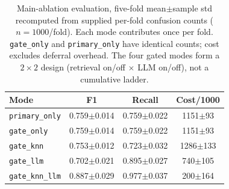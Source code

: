 \begin{table}[!t]
\centering
\caption{Main-ablation evaluation, five-fold mean$\pm$sample std recomputed from supplied per-fold confusion counts ($n{=}1000$/fold). Each mode contributes once per fold. \texttt{gate\_only} and \texttt{primary\_only} have identical counts; cost excludes deferral overhead. The four gated modes form a $2{\times}2$ design (retrieval on/off $\times$ LLM on/off), not a cumulative ladder.}
\label{tab:ablationmean}
\begin{tabular}{lccc}
\toprule
Mode & F1 & Recall & Cost/1000 \\
\midrule
\texttt{primary\_only} & 0.759$\pm$0.014 & 0.759$\pm$0.022 & 1151$\pm$93 \\
\texttt{gate\_only}  & 0.759$\pm$0.014 & 0.759$\pm$0.022 & 1151$\pm$93 \\
\texttt{gate\_knn}   & 0.753$\pm$0.012 & 0.723$\pm$0.032 & 1286$\pm$133 \\
\texttt{gate\_llm}   & 0.702$\pm$0.021 & 0.895$\pm$0.027 & 740$\pm$105 \\
\texttt{gate\_knn\_llm} & 0.887$\pm$0.029 & 0.977$\pm$0.037 & 200$\pm$164 \\
\bottomrule
\end{tabular}
\end{table}
